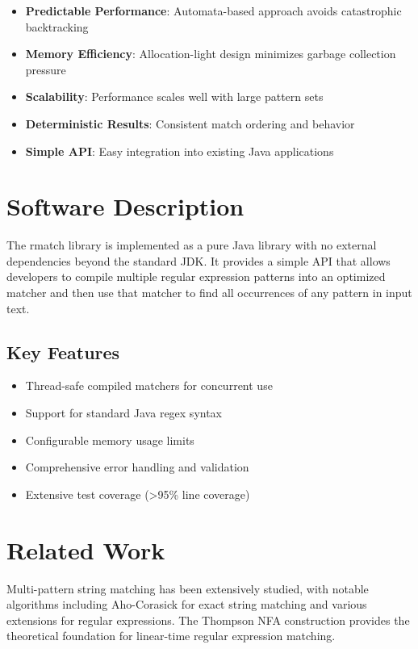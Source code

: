 \documentclass{article}
\begin{document}
\begin{itemize}
\item \textbf{Predictable Performance}: Automata-based approach avoids catastrophic backtracking
\item \textbf{Memory Efficiency}: Allocation-light design minimizes garbage collection pressure
\item \textbf{Scalability}: Performance scales well with large pattern sets
\item \textbf{Deterministic Results}: Consistent match ordering and behavior
\item \textbf{Simple API}: Easy integration into existing Java applications 
\end{itemize}

\section{Software Description}

The rmatch library is implemented as a pure Java library with no external dependencies beyond the standard JDK. It provides a simple API that allows developers to compile multiple regular expression patterns into an optimized matcher and then use that matcher to find all occurrences of any pattern in input text.

\subsection{Key Features}
\begin{itemize}
\item Thread-safe compiled matchers for concurrent use
\item Support for standard Java regex syntax
\item Configurable memory usage limits
\item Comprehensive error handling and validation
\item Extensive test coverage (>95\% line coverage) 
\end{itemize}

\section{Related Work}

Multi-pattern string matching has been extensively studied, with notable algorithms including Aho-Corasick \cite{aho1975efficient} for exact string matching and various extensions for regular expressions. The Thompson NFA construction \cite{thompson1968programming} provides the theoretical foundation for linear-time regular expression matching.
\end{document}
